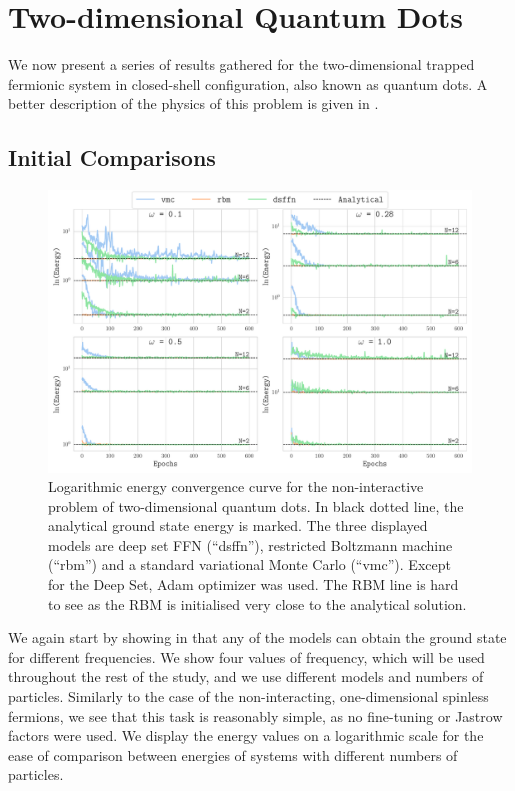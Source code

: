 \chapter{Two-dimensional Quantum Dots}\label{ch:dots}

We now present a series of results gathered for the two-dimensional trapped fermionic system in closed-shell configuration, also known as quantum dots. A better description of the physics of this problem is given in .

\section{Initial Comparisons}

\begin{figure}[H]
    \centering
    \includegraphics[width=0.9\linewidth]{Chapters/Results/dots/E_conv_ferm_dots_NI.pdf}
    \caption{Logarithmic energy convergence curve for the non-interactive problem of two-dimensional quantum dots. In black dotted line, the analytical ground state energy is marked. The three displayed models are deep set FFN (``dsffn''), restricted Boltzmann machine (``rbm'') and a standard variational Monte Carlo (``vmc''). Except for the Deep Set, Adam optimizer was used. The RBM line is hard to see as the RBM is initialised very close to the analytical solution.}
    \label{fig:E_conv_ferm_pol_NI}
\end{figure}


We again start by showing in  that any of the models can obtain the ground state for different frequencies. We show four values of frequency, which will be used throughout the rest of the study, and we use different models and numbers of particles. Similarly to the case of the non-interacting, one-dimensional spinless fermions, we see that this task is reasonably simple, as no fine-tuning or Jastrow factors were used. We display the energy values on a logarithmic scale for the ease of comparison between energies of systems with different numbers of particles.


